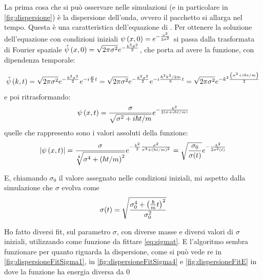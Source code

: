 La prima cosa che si pu\`o osservare nelle simulazioni (e in particolare in \autoref{fig:dispersione}) \`e la dispersione dell'onda, ovvero il pacchetto si allarga nel tempo. Questa \`e una caratteristica dell'equazione di \Schrodinger.
Per ottenere la soluzione dell'equazione con condizioni iniziali $\psi\lrt{x,0}=e^{-\frac{x^2}{2\sigma^2}}$ si passa dalla trasformata di Fourier spaziale $\hat\psi\lrt{x,0}=\sqrt{2\pi\sigma^2} e^{-\frac{k^2 \sigma^2}2}$, che porta ad avere la funzione, con dipendenza temporale:

\begin{equation}
\hat{\psi}\lrt{k,t} = \sqrt{2\pi\sigma^2} e^{-\frac{k^2 \sigma^2}2} e^{-i\frac E\hbar t} =
\sqrt{2\pi\sigma^2} e^{-\frac{k^2 \sigma^2}2} e^{-i\frac {\hbar^2 k^2/2m}\hbar t} = 
\sqrt{2\pi\sigma^2} e^{-k^2\frac{\lrt{\sigma^2+i\hbar t/m}}2 }
\end{equation}
e poi ritrasformando:
\begin{equation}
\psi\lrt{x,t} = \frac{\sigma}{\sqrt{\sigma^2 + i\hbar t /m}}
e^{-\frac{k^2}{2\lrt{\sigma + i\hbar t/m}}}
\end{equation}
quelle che rappresento sono i valori assoluti della funzione:
\begin{equation}
\lr||{\psi\lrt{x,t}} = \frac{\sigma}{\sqrt[4]{\sigma^4 + \lrt{\hbar t /m}^2}}
e^{-\frac{k^2}2\frac{\sigma^2}{\sigma^4 + \lrt{\hbar t /m}^2}} = \sqrt{\frac{\sigma_0}{\sigma(t)}}e^{-\frac{k^2}{2\sigma^2(t)}}
\end{equation}

E, chiamando $\sigma_0$ il valore assegnato nelle condizioni iniziali, mi aspetto dalla simulazione che $\sigma$ evolva come
\begin{equation}\label{eq:sigmat}
\sigma(t) = \sqrt{\frac{\sigma_0^4+\lrt{\frac\hbar m t}^2}{\sigma_0^2}}
\end{equation}

Ho fatto diversi fit, sul parametro $\sigma$, con diverse masse e diversi valori di $\sigma$ iniziali, utilizzando come funzione da fittare \eqref{eq:sigmat}. E l'algoritmo sembra funzionare per quanto riguarda la dispersione,  come si pu\`o vede re in \autoref{fig:dispersioneFitSigma1}, in
\autoref{fig:dispersioneFitSigma4} e \autoref{fig:dispersioneFitE} in dove la funzione ha energia diversa da 0

